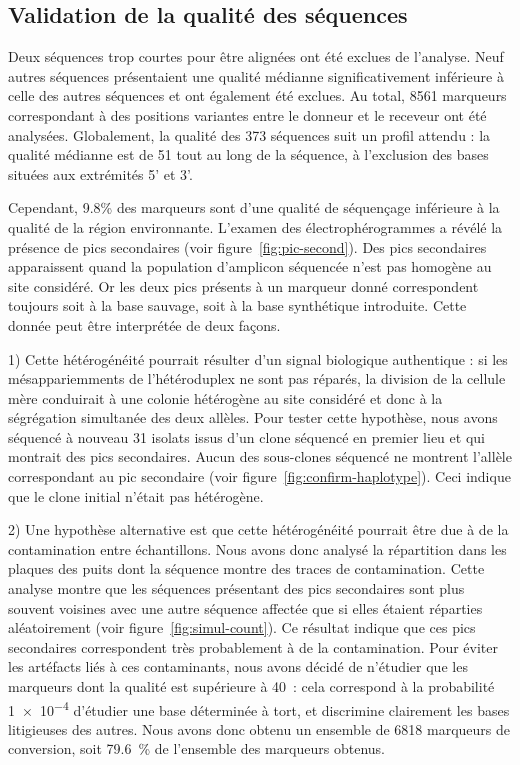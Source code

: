 \subsection{Validation de la qualité des séquences}
\label{sub:result-qualite}

Deux séquences trop courtes pour être alignées ont été exclues de l'analyse.
Neuf autres séquences présentaient une qualité médianne significativement
inférieure à celle des autres séquences et ont également été exclues. Au total,
\num{8561} marqueurs correspondant à des positions variantes entre le donneur et
le receveur ont été analysées. Globalement, la qualité des \num{373} séquences
suit un profil attendu : la qualité médianne est de \num{51} tout au long de la
séquence, à l'exclusion des bases situées aux extrémités 5' et 3'.

Cependant, \num{9.8}\% des marqueurs sont d'une qualité de séquençage inférieure
à la qualité de la région environnante. L'examen des électrophérogrammes a
révélé la présence de pics secondaires (voir figure~\ref{fig:pic-second}). Des
pics secondaires apparaissent quand la population d'amplicon séquencée n'est pas
homogène au site considéré. Or les deux pics présents à un marqueur donné
correspondent toujours soit à la base sauvage, soit à la base synthétique
introduite. Cette donnée peut être interprétée de deux façons.

1) Cette hétérogénéité pourrait résulter d'un signal biologique authentique : si
les mésappariemments de l'hétéroduplex ne sont pas réparés, la division de la
cellule mère conduirait à une colonie hétérogène au site considéré et donc à la
ségrégation simultanée des deux allèles. Pour tester cette hypothèse, nous avons
séquencé à nouveau \num{31} isolats issus d'un clone séquencé en premier lieu et
qui montrait des pics secondaires. Aucun des sous-clones séquencé ne montrent
l'allèle correspondant au pic secondaire (voir
figure~\ref{fig:confirm-haplotype}). Ceci indique que le clone initial n'était
pas hétérogène.

2) Une hypothèse alternative est que cette hétérogénéité pourrait être due à de
la contamination entre échantillons. Nous avons donc analysé la répartition dans
les plaques des puits dont la séquence montre des traces de contamination. Cette
analyse montre que les séquences présentant des pics secondaires sont plus
souvent voisines avec une autre séquence affectée que si elles étaient réparties
aléatoirement (voir figure~\ref{fig:simul-count}). Ce résultat indique que ces
pics secondaires correspondent très probablement à de la contamination. Pour
éviter les artéfacts liés à ces contaminants, nous avons décidé de n'étudier que
les marqueurs dont la qualité est supérieure à 40~: cela correspond à la
probabilité \num{1e-4} d'étudier une base déterminée à tort, et discrimine
clairement les bases litigieuses des autres. Nous avons donc obtenu un ensemble
de \num{6818} marqueurs de conversion, soit \SI{79.6}{\percent} de l'ensemble
des marqueurs obtenus.

